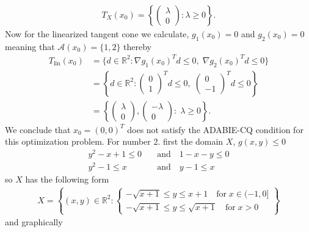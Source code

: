 \begin{align}
    T_X(x_0) = \left\{\begin{pmatrix} \lambda\\ 0 \end{pmatrix} : \lambda
\ge 0\right\}.
\end{align}
Now for the linearized tangent cone we calculate, $g_1(x_0) = 0$ and
$g_2(x_0) = 0$ meaning that $\mathcal{A}(x_0)=\{1, 2\}$ thereby
\begin{align}
    T_\text{lin}(x_0)
    &= \{d\in \mathbb{R}^{2}: \nabla g_1(x_0)^{T}d\le 0,\; \nabla g_2(x_0)^{T}d
    \le 0\}\\
    &= \left\{d\in \mathbb{R}^{2}: \begin{pmatrix}0\\1\end{pmatrix}^{T}d\le 0,\;
        \begin{pmatrix}0\\-1\end{pmatrix}^{T}d
    \le 0\right\}\\
    &= \left\{\begin{pmatrix} \lambda \\ 0 \end{pmatrix}, \begin{pmatrix} -\lambda
\\ 0 \end{pmatrix}:\; \lambda \ge 0 \right\}.
\end{align}
We conclude that $x_0 = (0, 0)^{T}$ does not satisfy the ADABIE-CQ
condition for this optimization problem.
\newline
For number 2. first the domain $X$, $g(x, y) \le 0$
\begin{align}
    y^{2}-x +1 \le 0 \quad &\text{and} \quad 1-x-y\le 0\\
    y^2 - 1 \le x \quad &\text{and} \quad y-1\le x
\end{align}
so $X$ has the following form
\begin{align}
    X = \left\{ \left( x,y \right) \in \mathbb{R}^{2}:
        \begin{cases}
            -\sqrt{x+1}\le y\le x+1
            \quad  \text{for}\; x\in(-1, 0]\\
            -\sqrt{x+1}\le y \le\sqrt{x+1}\quad \text{for}\; x > 0
        \end{cases}
    \right\}
\end{align}
and graphically
